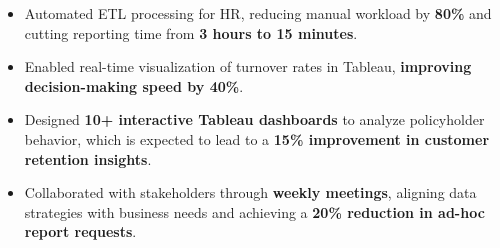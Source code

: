 \documentclass[10pt,a4paper,ragged2e,withhyper]{altacv}
\begin{document}
\begin{paracol}{2}
\scriptsize %
 

 

 

   





\endgroup



\switchcolumn



\begin{itemize}
  \item Automated ETL processing for HR, reducing manual workload by \textbf{80\%} and cutting reporting time from \textbf{3 hours to 15 minutes}.  
  \item Enabled real-time visualization of turnover rates in Tableau, \textbf{improving decision-making speed by 40\%}.  
  \item Designed \textbf{10+ interactive Tableau dashboards} to analyze policyholder behavior, which is expected to lead to a \textbf{15\% improvement in customer retention insights}.  
  \item Collaborated with stakeholders through \textbf{weekly meetings}, aligning data strategies with business needs and achieving a \textbf{20\% reduction in ad-hoc report requests}.  
\end{itemize}


\end{paracol}
\end{document}
